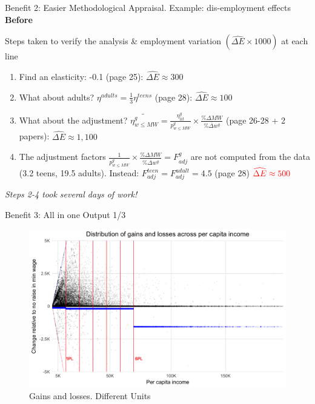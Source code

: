 \documentclass{beamer}
\def\red{\color{red}}
\begin{document}
\begin{frame}[label=low_tr_ex]{Benefit 2: Easier Methodological Appraisal. Example: dis-employment effects \textbf{Before}}


Steps taken to verify the analysis \&  employment variation $(\widehat{\Delta E}\times 1000)$ at each line\footnotemark 

 

\begin{enumerate}
\pause
\item Find an elasticity: -0.1 (page 25): {\red $\widehat{\Delta E} \approx 300$ }
\pause
\item What about adults? $\eta^{adults}=\frac{1}{3}\eta^{teens}$ (page 28):  {\red $\widehat{\Delta E} \approx 100$  } 
\pause
\item What about the adjustment? $\widetilde{ \eta^{g}_{w\leq MW} } =  \frac{\eta^{g}_{lit}}{p^{g}_{w\leq MW}} \times \frac{\%\Delta MW}{\overline{\%\Delta w^{g}}}$ (page 26-28 + 2 papers):   {\red $\widehat{\Delta E} \approx 1,100$  } 
\pause
\item The adjustment factors $\frac{1}{p^{g}_{w\leq MW}} \times \frac{\%\Delta MW}{\overline{\%\Delta w^{g}}} = F^{g}_{adj}$ are not computed from the data (3.2 teens, 19.5 adults). Instead: $F^{teen}_{adj} = F^{adult}_{adj}= 4.5$ (page 28) ${\red\widehat{\Delta E} \approx 500}$   
\end{enumerate}
\textit{Steps 2-4 took several days of work! }
\small{\hyperlink{fr_pa}{\beamerbutton{}}}
\end{frame}

\begin{frame}{Benefit 3: All in one Output 1/3}
\begin{figure}[h!]
\centering
\hspace*{-3em}
\includegraphics[scale = 0.13]{../Images/alt_pe1}
\caption{Gains and losses. Different Units}
\end{figure}	
\end{frame}
\end{document}
